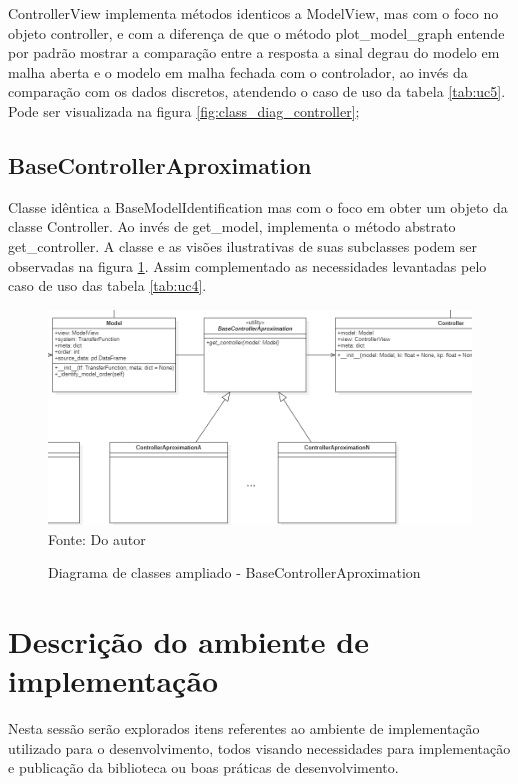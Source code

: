 ControllerView implementa métodos identicos a ModelView, mas com o foco no objeto controller, e com a diferença de que
o método plot\_model\_graph entende por padrão mostrar a comparação entre a resposta a sinal degrau do modelo em malha
aberta e o modelo em malha fechada com o controlador, ao invés da comparação com os dados discretos, atendendo o caso de
uso da tabela \ref{tab:uc5}.
Pode ser visualizada na figura \ref{fig:class_diag_controller};

\subsection{BaseControllerAproximation}

Classe idêntica a BaseModelIdentification mas com o foco em obter um objeto da classe Controller.
Ao invés de get\_model, implementa o método abstrato get\_controller.
A classe e as visões ilustrativas de suas subclasses podem ser observadas na figura \ref{fig:class_diag_bcacontroller}.
Assim complementado as necessidades levantadas pelo caso de uso das tabela \ref{tab:uc4}.

\begin{figure}[H]
    \centering
    \caption{Diagrama de classes ampliado - BaseControllerAproximation}
    \includegraphics[scale=0.6]{figuras/class_diag_bcacontroller}
    \label{fig:class_diag_bcacontroller}
    \\
    \vspace{0cm}\hspace{0cm}\small{Fonte: Do autor}
\end{figure}


\section{Descrição do ambiente de implementação}

Nesta sessão serão explorados itens referentes ao ambiente de implementação utilizado para o
desenvolvimento, todos visando necessidades para implementação e publicação da biblioteca ou boas práticas de
desenvolvimento.

